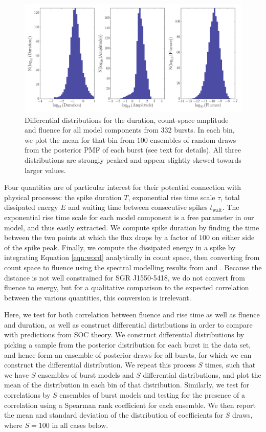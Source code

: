\documentclass[12pt]{emulateapj}
\begin{document}
\begin{figure}[htbp]
\begin{center}
\includegraphics[width=\textwidth]{sgr1550_diff_dist.pdf}
\caption{Differential distributions for the duration, count-space amplitude and fluence for all model components from $332$ bursts. In each bin, we plot the mean for
that bin from $100$ ensembles of random draws from the posterior PMF of each burst (see text for details). All three distributions are strongly peaked and appear slightly 
skewed towards larger values. }
\label{fig:diffdist}
\end{center}
\end{figure}

Four quantities are of particular interest for their potential connection with physical processes: the spike duration $T$, exponential rise time scale $\tau$,
total dissipated energy $E$ and waiting time between consecutive spikes $t_\mathrm{wait}$. The exponential rise time scale for each model component is a free parameter
in our model, and thus easily extracted. We compute spike duration by finding the time between the two points at which the flux drops by a
 factor of $100$ on either side of the spike peak. Finally, we compute the dissipated energy in a spike by integrating Equation \ref{eqn:word} analytically in count space,
 then converting from count space to fluence using the spectral modelling results from \citet{vanderhorst2012} and \citet{vonkienlin2012}. Because the distance is not well constrained for SGR J1550-5418, we do not convert from fluence to energy, but for a qualitative comparison to the expected correlation between the various quantities, this conversion is irrelevant.
 
 Here, we test for both correlation between fluence and rise time as well as fluence and duration, as well as construct differential distributions
 in order to compare with predictions from SOC theory. We construct differential distributions by picking a sample from the posterior distribution
 for each burst in the data set, and hence form an ensemble of posterior draws for all bursts, for which we can construct the differential distribution.
 We repeat this process $S$ times, such that we have $S$ ensembles of burst models and $S$ differential distributions, and plot the mean of the distribution in
 each bin of that distribution. 
 Similarly, we test for correlations by $S$ ensembles of burst models and testing for the presence of a correlation using a Spearman rank
 coefficient for each ensemble. We then report the mean and standard deviation of the distribution of coefficients for $S$ draws, where $S = 100$ in all cases below.
 
\end{document}
